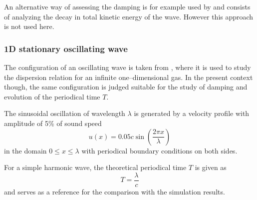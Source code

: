 \documentclass[11pt,a4paper,twoside]{report}
\begin{document}
An alternative way of assessing the damping is for example used by \cite{Attwood2007} and consists of analyzing the decay in total kinetic energy of the wave. However this approach is not used here. 



\subsubsection{1D stationary oscillating wave}
The configuration of an oscillating wave is taken from \cite{Monaghan2005}, where it is used to study the dispersion relation for an infinite one--dimensional gas. In the present context though, the same configuration is judged suitable for the study of damping and evolution of the periodical time $T$.

The sinusoidal oscillation of wavelength $\lambda$ is generated by a velocity profile with amplitude of 5\% of sound speed
\begin{equation}
\label{eq:InitialVelocityPerturbationOscillatingWave}
 u(x)=0.05 c\sin\left(\frac{2\pi x}{\lambda}\right)
\end{equation}
in the domain $0\leq x\leq \lambda$ with periodical boundary conditions on both sides.

For a simple harmonic wave, the theoretical periodical time $T$ is given as \cite{Stewart1930}
\begin{equation}
 T=\frac{\lambda}{c}
\end{equation}
and serves as a reference for the comparison with the simulation results.
\end{document}
